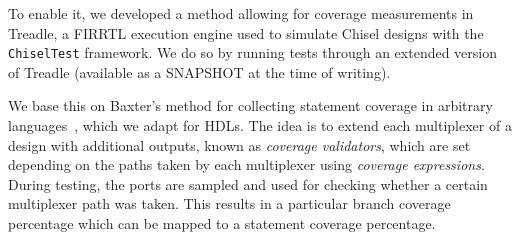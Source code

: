 \documentclass[conference]{IEEEtran}
\newcommand{\martin}[1]{{\color{blue} Martin: #1}}
\begin{document}
To enable it, we developed a method allowing for coverage measurements in Treadle, a FIRRTL execution engine used to simulate Chisel designs with the \texttt{ChiselTest} framework. We do so by running tests through an extended version of Treadle (available as a SNAPSHOT at the time of writing).%


We base this on Baxter's method for collecting statement coverage in arbitrary languages~\cite{branch-cov-made-easy:2002}, which we adapt for HDLs. 
The idea is to extend each multiplexer of a design with additional outputs, known as \textit{coverage validators}, which are set depending on the paths taken by each multiplexer using \textit{coverage expressions}.
During testing, the ports are sampled and used for checking whether a certain multiplexer path was taken.
This results in a particular branch coverage percentage which can be mapped to a statement coverage percentage.
\end{document}
